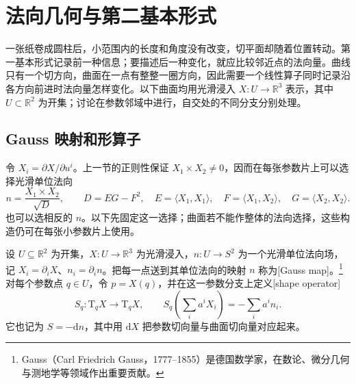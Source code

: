 
% 
% 

\section{法向几何与第二基本形式}
\label{g1:sec:0802}

一张纸卷成圆柱后，小范围内的长度和角度没有改变，切平面却随着位置转动。第一基本形式记录前一种信息；要描述后一种变化，就应比较邻近点的法向量。曲线只有一个切方向，曲面在一点有整整一圈方向，因此需要一个线性算子同时记录沿各方向前进时法向量怎样变化。以下曲面均用光滑浸入 \(X:U\to\mathbb R^3\) 表示，其中 \(U\subset\mathbb R^2\) 为开集；讨论在参数邻域中进行，自交处的不同分支分别处理。

\subsection{Gauss 映射和形算子}
\label{g1:subsec:0802:01}

令 \(X_i=\partial X/\partial u^i\)。上一节的正则性保证 \(X_1\times X_2\ne0\)，因而在每张参数片上可以选择光滑单位法向
\[
	n=\frac{X_1\times X_2}{\sqrt D},\qquad
	D=EG-F^2,\quad E=\langle X_1,X_1\rangle,\quad F=\langle X_1,X_2\rangle,\quad G=\langle X_2,X_2\rangle.
\]
也可以选相反的 \(n\)。以下先固定这一选择；曲面若不能作整体的法向选择，这些构造仍可在每张小参数片上使用。

\begin{definition}\label{g1:def:shape-operator}
	设 \(U\subseteq\mathbb R^2\) 为开集，\(X:U\to\mathbb R^3\) 为光滑浸入，\(n:U\to S^2\) 为一个光滑单位法向场，记 \(X_i=\partial_iX\)、\(n_i=\partial_in\)。把每一点送到其单位法向的映射 \(n\) 称为[Gauss map]。\footnote{Gauss（Carl Friedrich Gauss，1777--1855）是德国数学家，在数论、微分几何与测地学等领域作出重要贡献。}对每个参数点 \(q\in U\)，令 \(p=X(q)\)，并在这一参数分支上定义[shape operator]
	\[
		S_q:\mathrm{T}_qX\longrightarrow \mathrm{T}_qX,\qquad
		S_q\!\left(\sum_i a^iX_i\right)=-\sum_i a^i n_i.
	\]
	它也记为 \(S=-\mathrm dn\)，其中用 \(\mathrm dX\) 把参数切向量与曲面切向量对应起来。
\end{definition}

